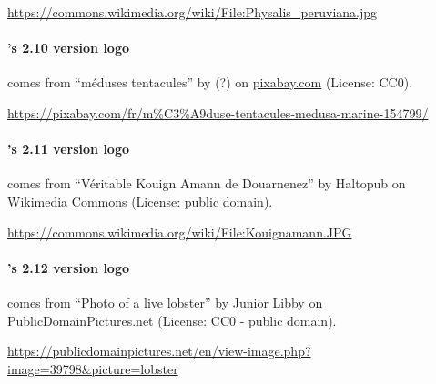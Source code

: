 \url{https://commons.wikimedia.org/wiki/File:Physalis_peruviana.jpg}
 

\paragraph{\imitator{}'s 2.10 version logo} comes from ``méduses tentacules'' by (?) on \url{pixabay.com}
	(License: CC0).

\url{https://pixabay.com/fr/m%C3%A9duse-tentacules-medusa-marine-154799/}

\paragraph{\imitator{}'s 2.11 version logo} comes from ``Véritable Kouign Amann de Douarnenez'' by Haltopub on Wikimedia Commons
	(License: public domain).

\url{https://commons.wikimedia.org/wiki/File:Kouignamann.JPG}
 
\paragraph{\imitator{}'s 2.12 version logo} comes from ``Photo of a live lobster'' by Junior Libby on PublicDomainPictures.net
	(License: CC0 - public domain).

\url{https://publicdomainpictures.net/en/view-image.php?image=39798&picture=lobster}

 
